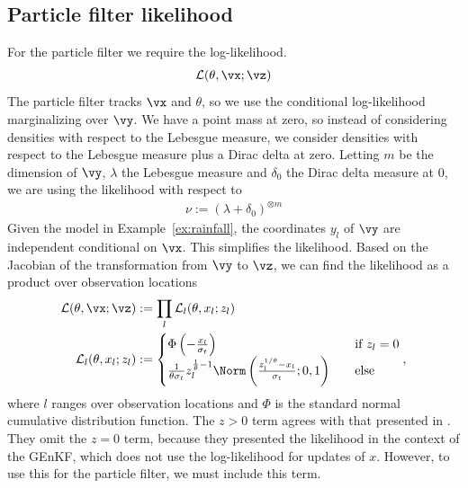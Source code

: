 \documentclass[12pt]{article}
\begin{document}
\subsection{Particle filter likelihood}\label{sec:pf_likelihood}
For the particle filter we require the log-likelihood.
\begin{align}
    \mathcal L(\theta, \vx; \vz)
\end{align}
The particle filter tracks $\vx$ and $\theta$, so we use the conditional log-likelihood
marginalizing over $\vy$. We have a point mass at zero, so instead of considering
densities with respect to the Lebesgue measure, we consider densities with
respect to the Lebesgue measure plus a Dirac delta at zero. Letting
$m$ be the dimension of $\vy$, $\lambda$ the Lebesgue measure and $\delta_0$
the Dirac delta measure at $0$, we are using the likelihood with respect to
\begin{align}
    \nu := (\lambda + \delta_0)^{\otimes m}
\end{align}
Given the model in 
Example~\ref{ex:rainfall}, the coordinates $y_l$ of $\vy$ are independent conditional
on $\vx$. This simplifies the likelihood. Based on the Jacobian of the
transformation from $\vy$ to $\vz$, we can find the likelihood as a product
over observation locations
\begin{align}
    \mathcal L(\theta, \vx; \vz) &:= 
        \prod_l \mathcal L_l(\theta, x_l; z_l) \\
    \mathcal L_l(\theta, x_l; z_l) &:=
        \begin{cases}
            \Phi\left(-\frac{x_l}{\sigma_t}\right)\quad &\text{if } z_l = 0 \\
            \frac{1}{\theta\sigma_t}z_l^{\frac 1 \theta - 1}\Norm\left(\frac{z_l^{1/\theta}-x_l}{\sigma_t}; 0, 1\right)\quad &\text{else}
        \end{cases},
\end{align}
where $l$ ranges over observation locations and $\Phi$ is the standard normal cumulative distribution function. The $z > 0$ term agrees with that
presented in \cite{katzfuss2020}. They omit the $z=0$ term, because they
presented the likelihood in the context of the GEnKF, which does not use the
log-likelihood for updates of $x$. However, to use this for the particle filter,
we must include this term.
\end{document}

